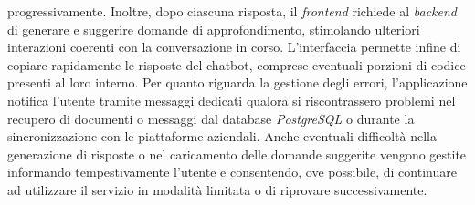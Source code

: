 progressivamente. Inoltre, dopo ciascuna risposta, il \emph{frontend} 
richiede al \emph{backend} di generare e suggerire domande di 
approfondimento, stimolando ulteriori interazioni coerenti con la conversazione in corso. L'interfaccia 
permette infine di copiare rapidamente le risposte del chatbot, comprese eventuali porzioni di codice 
presenti al loro interno.
Per quanto riguarda la gestione degli errori, l’applicazione notifica l’utente tramite messaggi 
dedicati qualora si riscontrassero problemi nel recupero di documenti o messaggi dal database
\emph{PostgreSQL} o durante la sincronizzazione con le 
piattaforme aziendali. Anche eventuali difficoltà nella generazione di risposte o nel caricamento delle 
domande suggerite vengono gestite informando tempestivamente l’utente e consentendo, ove possibile, di 
continuare ad utilizzare il servizio in modalità limitata o di riprovare successivamente.


